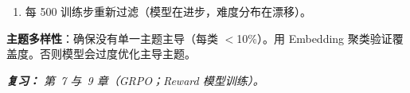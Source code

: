 \begin{questionbox}
\begin{enumerate}
\begin{itemize}
  \item $<$20\%：太难。模型几乎总失败 $\rightarrow$ 全是负 advantage $\rightarrow$ 无有效梯度。
  \item $>$80\%：太易。模型几乎总成功 $\rightarrow$ 全是正 advantage $\rightarrow$ 无对比。
  \item 20--80\%：完美。成功与失败兼有 $\rightarrow$ 关于“什么有效”的清晰信号。
\end{itemize}
  \item 每 500 训练步重新过滤（模型在进步，难度分布在漂移）。
\end{enumerate}

\textbf{主题多样性}：确保没有单一主题主导（每类 $<$10\%）。用 Embedding 聚类验证覆盖度。否则模型会过度优化主导主题。

\emph{\textbf{复习：} 第~7 与~9 章（GRPO；Reward 模型训练）。}
\end{questionbox}

